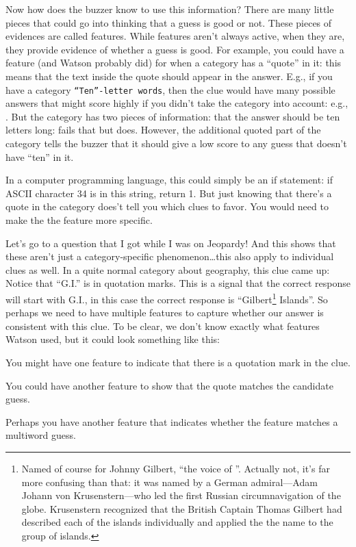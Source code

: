 Now how does the buzzer know to use this information?
%
There are many little pieces that could go into thinking that a guess is good
or not.  These pieces of evidences are called features.
%
While features aren’t
always active, when they are, they provide evidence of whether a guess is
good.
%
For example, you could have a feature (and Watson probably did) for
when a category has a ``quote'' in it: this means that the text inside the
quote should appear in the answer.
%
E.g., if you have a category \texttt{``Ten''-letter words}, then the clue
would have many possible answers that might score highly if you didn't take
the category into account: e.g., .
%
But the category has two pieces of information: that the answer should be ten
letters long:  fails that but  does.
%
However, the additional quoted part of the category tells the buzzer that it
should give a low score to any guess that doesn't have ``ten'' in it.

In a computer programming language, this could simply be an if statement: if
ASCII character 34 is in this string, return 1.  But just knowing that there’s
a quote in the category does’t tell you which clues to favor.  You would need
to make the the feature more specific.

Let’s go to a question that I got while I was on Jeopardy!  And this shows
that these aren’t just a category-specific phenomenon\dots this
also apply to individual clues as well.  In a quite normal category about
geography, this clue came up:
Notice that ``G.I.'' is in quotation marks.  This is a signal that the correct response will start with G.I., in this case the correct response is ``Gilbert\footnote{Named of course for Johnny Gilbert, ``the voice of \jeopardy{}''.  Actually not, it’s far more confusing than that: it was named by a German admiral---Adam Johann von Krusenstern---who led the first Russian circumnavigation of the globe.  Krusenstern recognized that the British Captain Thomas Gilbert had described each of the islands individually and applied the the name to the group of islands.}
Islands''.
%
So perhaps we need to have multiple features to capture whether our answer is
consistent with this clue.
%
To be clear, we don’t know exactly what features Watson used, but it could
look something like this:
\begin{itemize*}
  \item You might have one feature to indicate that there is a quotation mark
    in the clue.
    \item You could have another feature to show that the quote matches the
      candidate guess.
      \item Perhaps you have another feature that indicates whether the
        feature matches a multiword guess.
\end{itemize*}

